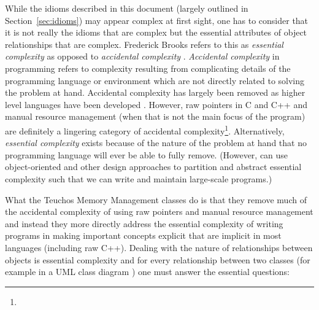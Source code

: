 \documentclass[pdf,ps2pdf,11pt]{SANDreport}
\begin{document}
While the idioms described in this document (largely outlined in
Section~\ref{sec:idioms}) may appear complex at first sight, one has
to consider that it is not really the idioms that are complex but the
essential attributes of object relationships that are complex.
Frederick Brooks refers to this as {}\textit{essential complexity} as
opposed to {}\textit{accidental complexity}
{}\cite{MythicalManMonth95}.  {}\textit{Accidental complexity} in
programming refers to complexity resulting from complicating details
of the programming language or environment which are not directly
related to solving the problem at hand.  Accidental complexity has
largely been removed as higher level languages have been developed
{}\cite[Chapter 16]{MythicalManMonth95}.  However, raw pointers in C
and C++ and manual resource management (when that is not the main
focus of the program) are definitely a lingering category of
accidental complexity\footnote{
{}}.
Alternatively, {}\textit{essential complexity} exists because of the
nature of the problem at hand that no programming language will ever
be able to fully remove.  (However, can use object-oriented and other
design approaches to partition and abstract essential complexity such
that we can write and maintain large-scale programs.)

What the Teuchos Memory Management classes do is that they remove much
of the accidental complexity of using raw pointers and manual resource
management and instead they more directly address the essential
complexity of writing programs in making important concepts explicit
that are implicit in most languages (including raw C++).  Dealing with
the nature of relationships between objects is essential complexity
and for every relationship between two classes (for example in a UML
class diagram {}\cite{UMLDistilledThirdEdition04}) one must answer the
essential questions:
\end{document}
